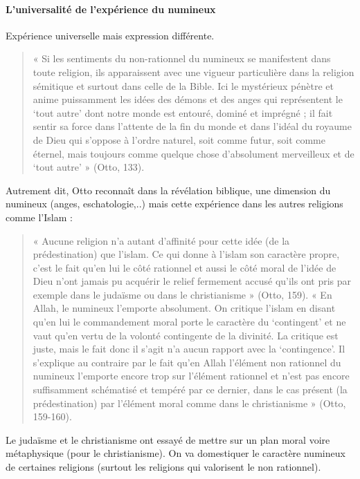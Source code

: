 \paragraph{L’universalité de l’expérience du numineux }
 Expérience universelle mais expression différente.
 \begin{quote}
     « Si les sentiments du non-rationnel du numineux se manifestent dans toute religion, ils apparaissent avec une vigueur particulière dans la religion sémitique et surtout dans celle de la Bible. Ici le mystérieux pénètre et anime puissamment les idées des démons et des anges qui représentent le ‘tout autre’ dont notre monde est entouré, dominé et imprégné ; il fait sentir sa force dans l’attente de la fin du monde et dans l’idéal du royaume de Dieu qui s’oppose à l’ordre naturel, soit comme futur, soit comme éternel, mais toujours comme quelque chose d’absolument merveilleux et de ‘tout autre’ » (Otto, 133). 
 \end{quote}
Autrement dit, Otto reconnaît dans la révélation biblique, une dimension du numineux (anges, eschatologie,..) mais cette expérience dans les autres religions comme l'Islam : 
\begin{quote}
    « Aucune religion n’a autant d’affinité pour cette idée (de la prédestination) que l’islam.  Ce qui donne à l’islam son caractère propre, c’est le fait qu’en lui le côté rationnel et aussi le côté moral de l’idée de Dieu n’ont jamais pu acquérir le relief fermement accusé qu’ils ont pris par exemple dans le judaïsme ou dans le christianisme » (Otto, 159). « En Allah, le numineux l’emporte absolument. On critique l’islam en disant qu’en lui le commandement moral porte le caractère du ‘contingent’ et ne vaut qu’en vertu de la volonté contingente de la divinité. La critique est juste, mais le fait donc il s’agit n’a aucun rapport avec la ‘contingence’. Il s’explique au contraire par le fait qu’en Allah l’élément non rationnel du numineux l’emporte encore trop sur l’élément rationnel et n’est pas encore suffisamment schématisé et tempéré par ce dernier, dans le cas présent (la prédestination) par l’élément moral comme dans le christianisme » (Otto, 159-160). 
\end{quote}
Le judaïsme et le christianisme ont essayé de mettre sur un plan moral voire métaphysique (pour le christianisme). 
On va domestiquer le caractère numineux de certaines religions (surtout les religions qui valorisent le non rationnel). 

